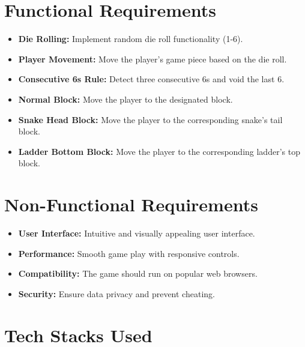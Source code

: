 \documentclass{article}
\begin{document}
\newpage

\section{Functional Requirements}
    \begin{itemize}
        \item \textbf{Die Rolling:} Implement random die roll functionality (1-6).
        \item \textbf{Player Movement:} Move the player's game piece based on the die roll.
        \item \textbf{Consecutive 6s Rule:} Detect three consecutive 6s and void the last 6.
        \item \textbf{Normal Block:} Move the player to the designated block.
        \item \textbf{Snake Head Block:} Move the player to the corresponding snake's tail block.
        \item \textbf{Ladder Bottom Block:} Move the player to the corresponding ladder's top block.
    \end{itemize}

\section{Non-Functional Requirements}
    \begin{itemize}
        \item \textbf{User Interface:} Intuitive and visually appealing user interface.
        \item \textbf{Performance:} Smooth game play with responsive controls.
        \item \textbf{Compatibility:} The game should run on popular web browsers.
        \item \textbf{Security:} Ensure data privacy and prevent cheating.
    \end{itemize}

\section{Tech Stacks Used}
\end{document}
